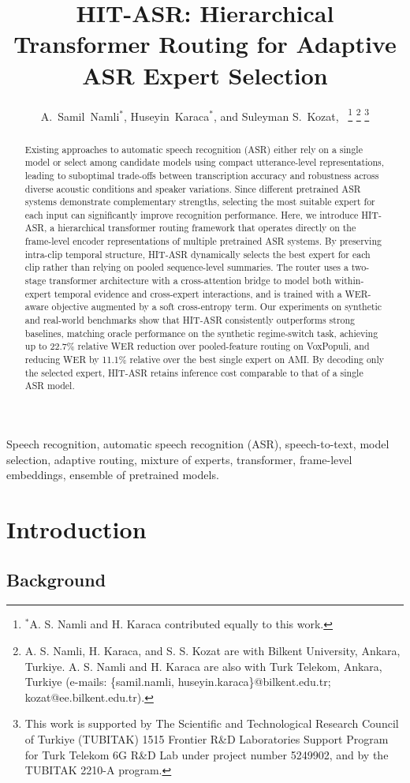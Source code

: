 \documentclass[journal]{IEEEtran}
\title{HIT-ASR: Hierarchical Transformer Routing for Adaptive ASR Expert Selection}
\author{A.~Samil~Namli$^{*}$, 
        Huseyin~Karaca$^{*}$,
        and Suleyman S.~Kozat,~\IEEEmembership{Senior~Member,~IEEE}
\thanks{$^{*}$A. S. Namli and H. Karaca contributed equally to this work.}
\thanks{A. S. Namli, H. Karaca, and S. S. Kozat are with Bilkent University, Ankara, Turkiye. A. S. Namli and H. Karaca are also with Turk Telekom, Ankara, Turkiye (e-mails: \{samil.namli, huseyin.karaca\}@bilkent.edu.tr; kozat@ee.bilkent.edu.tr).}%
\thanks{This work is supported by The Scientific and Technological Research Council of Turkiye (TUBITAK) 1515 Frontier R\&D Laboratories Support Program for Turk Telekom 6G R\&D Lab under project number 5249902, and by the TUBITAK 2210-A program.}%
}
\date{}
\begin{document}
\maketitle 

\begin{abstract}
Existing approaches to automatic speech recognition (ASR) either rely on a single model or select among candidate models using compact utterance-level representations, leading to suboptimal trade-offs between transcription accuracy and robustness across diverse acoustic conditions and speaker variations. Since different pretrained ASR systems demonstrate complementary strengths, selecting the most suitable expert for each input can significantly improve recognition performance. Here, we introduce HIT-ASR, a hierarchical transformer routing framework that operates directly on the frame-level encoder representations of multiple pretrained ASR systems. By preserving intra-clip temporal structure, HIT-ASR dynamically selects the best expert for each clip rather than relying on pooled sequence-level summaries. The router uses a two-stage transformer architecture with a cross-attention bridge to model both within-expert temporal evidence and cross-expert interactions, and is trained with a WER-aware objective augmented by a soft cross-entropy term. Our experiments on synthetic and real-world benchmarks show that HIT-ASR consistently outperforms strong baselines, matching oracle performance on the synthetic regime-switch task, achieving up to 22.7\% relative WER reduction over pooled-feature routing on VoxPopuli, and reducing WER by 11.1\% relative over the best single expert on AMI. By decoding only the selected expert, HIT-ASR retains inference cost comparable to that of a single ASR model.
\end{abstract}

\begin{IEEEkeywords}
Speech recognition, automatic speech recognition (ASR),
speech-to-text, model selection, adaptive routing, mixture of
experts, transformer, frame-level embeddings, ensemble of pretrained
models.
\end{IEEEkeywords}


\section{Introduction}
\label{sec:introduction}

\subsection{Background}
\end{document}

